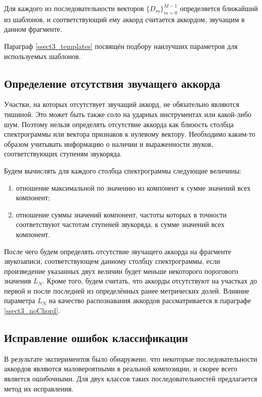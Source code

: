 Для каждого из последовательности векторов $\{D_m\}_{m=0}^{M-1}$ определяется
ближайший из шаблонов, и соответствующий ему аккорд считается аккордом, звучащим
в данном фрагменте.

Параграф \ref{ssect3_templates} посвящён подбору наилучших параметров для
используемых шаблонов.

\subsection{Определение отсутствия звучащего аккорда} \label{ssect1_noChord}

Участки, на которых отсутствует звучащий аккорд, не обязательно являются
тишиной. Это может быть также соло на ударных инструментах или какой-либо шум.
Поэтому нельзя определять отсутствие аккорда как близость столбца спектрограммы
или вектора признаков к нулевому вектору. Необходимо каким-то образом учитывать
информацию о наличии и выраженности звуков, соответствующих ступеням звукоряда.

Будем вычислять для каждого столбца спектрограммы следующие величины:
\begin{enumerate}
  \item отношение максимальной по значению из компонент к сумме значений
  всех компонент;
  \item отношение суммы значений компонент, частоты которых в точности
  соответствуют частотам ступеней звукоряда, к сумме значений всех компонент.
\end{enumerate}
После чего будем определять отсутствие звучащего аккорда на фрагменте
звукозаписи, соответствующем данному столбцу спектрограммы, если произведение
указанных двух величин будет меньше некоторого порогового значения $L_{N}$.
Кроме того, будем считать, что аккорды отсутствуют на участках до первой и
после последней из определённых ранее метрических долей. Влияние параметра
$L_{N}$ на качество распознавания аккордов рассматривается в параграфе
\ref{ssect3_noChord}.

\subsection{Исправление ошибок классификации} \label{ssect1_errcorr}

В результате экспериментов было обнаружено, что некоторые последовательности
аккордов являются маловероятными в реальной композиции, и скорее всего является
ошибочными. Для двух классов таких последовательностей предлагается метод их
исправления.

